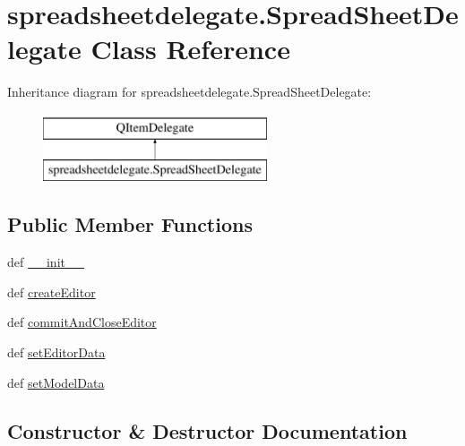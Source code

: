 \hypertarget{classspreadsheetdelegate_1_1SpreadSheetDelegate}{}\section{spreadsheetdelegate.\+Spread\+Sheet\+Delegate Class Reference}
\label{classspreadsheetdelegate_1_1SpreadSheetDelegate}
Inheritance diagram for spreadsheetdelegate.\+Spread\+Sheet\+Delegate\+:\begin{figure}[H]
\begin{center}
\leavevmode
\includegraphics[height=2.000000cm]{classspreadsheetdelegate_1_1SpreadSheetDelegate}
\end{center}
\end{figure}
\subsection*{Public Member Functions}
\begin{DoxyCompactItemize}
\item 
def \hyperlink{classspreadsheetdelegate_1_1SpreadSheetDelegate_ac39ae26e70816585e041dbeb230b9b5c}{\+\_\+\+\_\+init\+\_\+\+\_\+}
\item 
def \hyperlink{classspreadsheetdelegate_1_1SpreadSheetDelegate_a528c9cfadabf7aafcd03765ab1ea9397}{create\+Editor}
\item 
def \hyperlink{classspreadsheetdelegate_1_1SpreadSheetDelegate_aab120189df82b8d8741c9b475a93a95d}{commit\+And\+Close\+Editor}
\item 
def \hyperlink{classspreadsheetdelegate_1_1SpreadSheetDelegate_a0d4ae7d2c3fad01681cea41808727015}{set\+Editor\+Data}
\item 
def \hyperlink{classspreadsheetdelegate_1_1SpreadSheetDelegate_a952a7ddcd89effb224f56dcd1c98fe64}{set\+Model\+Data}
\end{DoxyCompactItemize}


\subsection{Constructor \& Destructor Documentation}
\hypertarget{classspreadsheetdelegate_1_1SpreadSheetDelegate_ac39ae26e70816585e041dbeb230b9b5c}{}
